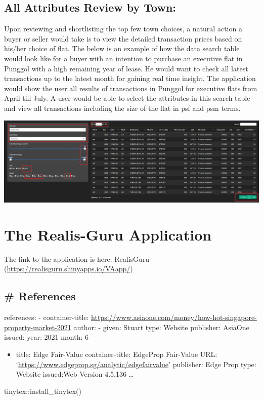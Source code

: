 \documentclass{acm_proc_article-sp}
\providecommand{\tightlist}{%
  \setlength{\itemsep}{0pt}\setlength{\parskip}{0pt}}
\newenvironment{Shaded}{\begin{snugshade}}{\end{snugshade}}
\newcommand{\FunctionTok}[1]{\textcolor[rgb]{0.00,0.00,0.00}{#1}}
\newcommand{\NormalTok}[1]{#1}
\newcommand{\SpecialCharTok}[1]{\textcolor[rgb]{0.00,0.00,0.00}{#1}}
\begin{document}
\hypertarget{all-attributes-review-by-town}{%
\subsection{All Attributes Review by
Town:}\label{all-attributes-review-by-town}}

Upon reviewing and shortlisting the top few town choices, a natural
action a buyer or seller would take is to view the detailed transaction
prices based on his/her choice of flat. The below is an example of how
the data search table would look like for a buyer with an intention to
purchase an executive flat in Punggol with a high remaining year of
lease. He would want to check all latest transactions up to the latest
month for gaining real time insight. The application would show the user
all results of transactions in Punggol for executive flats from April
till July. A user would be able to select the attributes in this search
table and view all transactions including the size of the flat in psf
and psm terms.

\includegraphics{IMG/img15.jpg}

\hypertarget{the-realis-guru-application}{%
\section{The Realis-Guru
Application}\label{the-realis-guru-application}}

The link to the application is here: RealisGuru
(\url{https://realisguru.shinyapps.io/VAapp/})

\hypertarget{references}{%
\subsection{\# References}\label{references}}

references: - container-title:
\url{https://www.asiaone.com/money/how-hot-singapore-property-market-2021}
author: - given: Stuart type: Website publisher: AsiaOne issued: year:
2021 month: 6 ---

\begin{itemize}
\tightlist
\item
  title: Edge Fair-Value container-title: EdgeProp Fair-Value URL:
  `\url{https://www.edgeprop.sg/analytic/edgefairvalue}' publisher: Edge
  Prop type: Website issued:Web Version 4.5.136 \ldots{}
\end{itemize}

\begin{Shaded}
\begin{Highlighting}[]
\NormalTok{tinytex}\SpecialCharTok{::}\FunctionTok{install\_tinytex}\NormalTok{()}
\end{Highlighting}
\end{Shaded}

\setlength{\parindent}{0in}
\end{document}
